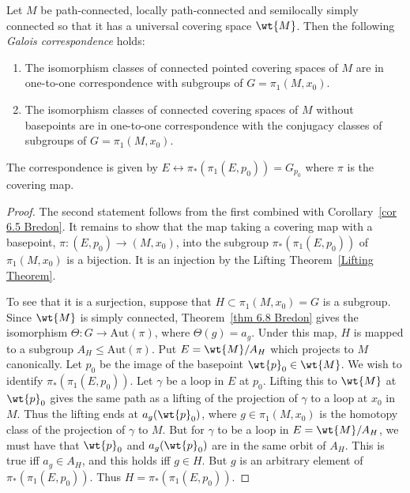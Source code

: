 \begin{thm}
    Let $M$ be path-connected, locally path-connected and semilocally simply connected so that it has a universal covering space $\wt{M}$. Then the following \emph{Galois correspondence} holds:
\begin{enumerate}
	\item The isomorphism classes of connected pointed covering spaces of $M$ are in one-to-one correspondence with subgroups of $G=\pi_1(M, x_0)$. 
	\item The isomorphism classes of connected covering spaces of $M$ without basepoints are in one-to-one correspondence with the conjugacy classes of subgroups of $G=\pi_1(M, x_0)$.
\end{enumerate}
The correspondence is given by $E\leftrightarrow \pi_\ast(\pi_1(E,p_0))=G_{p_0}$ where $\pi$ is the covering map.
\end{thm}
\begin{proof}
    The second statement follows from the first combined with Corollary~\ref{cor 6.5 Bredon}. It remains to show that the map taking a covering map with a basepoint, $\pi:(E,p_0)\to (M,x_0)$, into the subgroup $\pi_\ast(\pi_1(E,p_0))$ of $\pi_1(M,x_0)$ is a bijection. It is an injection by the Lifting Theorem~\ref{Lifting Theorem}. 
    
    To see that it is a surjection, suppose that $H\subset \pi_1(M,x_0)=G$ is a subgroup. Since $\wt{M}$ is simply connected, Theorem~\ref{thm 6.8 Bredon} gives the isomorphism $\Theta:G\to \mathrm{Aut}(\pi)$, where $\Theta(g)=a_g$. Under this map, $H$ is mapped to a subgroup $A_H\leq \mathrm{Aut}(\pi)$. Put $E=\wt{M}/A_H$ which projects to $M$ canonically. Let $p_0$ be the image of the basepoint $\wt{p}_0\in\wt{M}$. We wish to identify $\pi_\ast(\pi_1(E,p_0))$. Let $\gamma$ be a loop in $E$ at $p_0$. Lifting this to $\wt{M}$ at $\wt{p}_0$ gives the same path as a lifting of the projection of $\gamma$ to a loop at $x_0$ in $M$. Thus the lifting ends at $a_g(\wt{p}_0)$, where $g\in\pi_1(M,x_0)$ is the homotopy class of the projection of $\gamma$ to $M$. But for $\gamma$ to be a loop in $E=\wt{M}/A_H$, we must have that $\wt{p}_0$ and $a_g(\wt{p}_0)$ are in the same orbit of $A_H$. This is true iff $a_g\in A_H$, and this holds iff $g\in H$. But $g$ is an arbitrary element of $\pi_\ast(\pi_1(E,p_0))$. Thus $H=\pi_\ast(\pi_1(E,p_0))$.
\end{proof}


